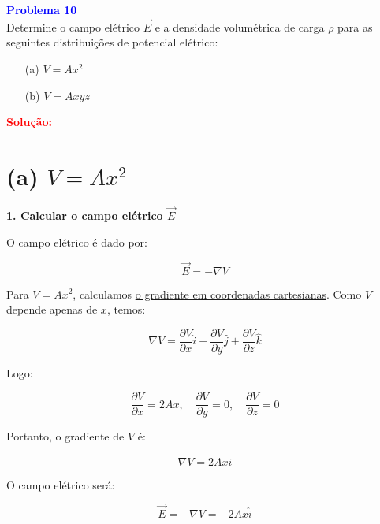 \documentclass[a4paper,12pt]{article}
\begin{document}
\begin{flushleft}
\textbf{\textcolor{blue}{\Large Problema 10}}\\

Determine o campo elétrico \( \vec{E} \) e a densidade volumétrica de carga \( \rho \) para as 
seguintes distribuições de potencial elétrico:

\begin{itemize}
    \item[(a)] \( V = A x^2 \)
    \item[(b)] \( V = A x y z \)
\end{itemize}

\textcolor{red}{\textbf{Solução:}}\\

\section*{(a) \( V = A x^2 \)}

\textbf{1. Calcular o campo elétrico \( \vec{E} \)}

O campo elétrico é dado por:

\begin{equation}
\boxed{\vec{E} = -\nabla V}
\end{equation}

Para \( V = A x^2 \), calculamos \underline{o gradiente em coordenadas cartesianas}. Como \(V\) depende apenas de \(x\), temos:

\begin{equation}
\nabla V = \frac{\partial V}{\partial x} \hat{i} + \frac{\partial V}{\partial y} \hat{j} + \frac{\partial V}{\partial z} \hat{k}
\end{equation}

Logo:

\begin{equation}
\frac{\partial V}{\partial x} = 2 A x, \quad \frac{\partial V}{\partial y} = 0, \quad \frac{\partial V}{\partial z} = 0
\end{equation}

Portanto, o gradiente de \(V\) é:

\begin{equation}
\nabla V = 2 A x \hat{i}
\end{equation}

O campo elétrico será:

\begin{equation}
\vec{E} = -\nabla V = - 2 A x \hat{i}
\end{equation}


\end{flushleft}
\end{document}
